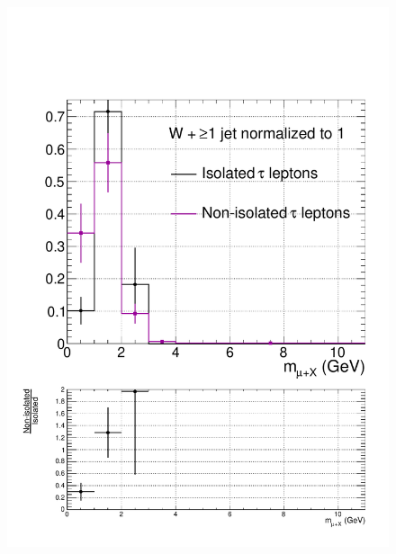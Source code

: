 \begin{figure}[hbtp]
\begin{center}
    \includegraphics[width=0.8\cmsFigWidth]{figures/isoVsNonIsoTaus_WNJets_lowMT_v87}

\end{center}
\end{figure}
